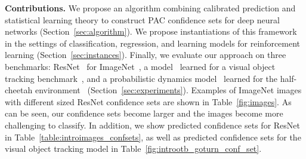 \documentclass{article} \usepackage{iclr2020_conference,times}
\renewcommand{\(}						{\left(}
\renewcommand{\)}						{\right)}
\renewcommand{\[}						{\left[}
\renewcommand{\]}						{\right]}
\newcommand{\<}						{\left<}
\renewcommand{\>}						{\right>}
\begin{document}
\textbf{Contributions.}
We propose an algorithm combining calibrated prediction and statistical learning theory to construct PAC confidence sets for deep neural networks (Section~\ref{sec:algorithm}). We propose instantiations of this framework in the settings of classification, regression, and learning models for reinforcement learning (Section~\ref{sec:instances}). Finally, we evaluate our approach on three benchmarks: ResNet~\citep{he2016deep} for ImageNet~\citep{russakovsky2015imagenet}, a model~\citep{held2016learning} learned for a visual object tracking benchmark~\citep{WuLimYang13}, and a probabilistic dynamics model~\citep{chua2018deep} learned for the half-cheetah environment~\citep{brockman2016openai} (Section~\ref{sec:experiments}). Examples of ImageNet images with different sized ResNet confidence sets are shown in Table~\ref{fig:images}. As can be seen, our confidence sets become larger and the images become more challenging to classify. In addition, we show predicted confidence sets for ResNet in Table~\ref{table:introimages_confsets}, as well as predicted confidence sets for the visual object tracking model in Table~\ref{fig:introotb_goturn_conf_set}.
\end{document}
